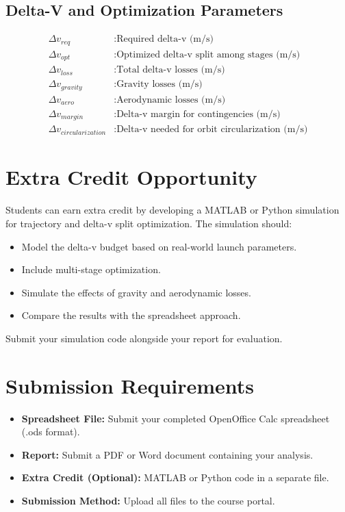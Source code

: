 \documentclass[a4paper,12pt]{article}
\begin{document}
\subsection{Delta-V and Optimization Parameters}
\begin{align*}
    \Delta v_{req} & : \text{Required delta-v (m/s)} \\
    \Delta v_{opt} & : \text{Optimized delta-v split among stages (m/s)} \\
    \Delta v_{loss} & : \text{Total delta-v losses (m/s)} \\
    \Delta v_{gravity} & : \text{Gravity losses (m/s)} \\
    \Delta v_{aero} & : \text{Aerodynamic losses (m/s)} \\
    \Delta v_{margin} & : \text{Delta-v margin for contingencies (m/s)} \\
    \Delta v_{circularization} & : \text{Delta-v needed for orbit circularization (m/s)}
\end{align*}

\section{Extra Credit Opportunity}
Students can earn extra credit by developing a MATLAB or Python simulation for trajectory and delta-v split optimization. The simulation should:
\begin{itemize}
    \item Model the delta-v budget based on real-world launch parameters.
    \item Include multi-stage optimization.
    \item Simulate the effects of gravity and aerodynamic losses.
    \item Compare the results with the spreadsheet approach.
\end{itemize}
Submit your simulation code alongside your report for evaluation.

\section{Submission Requirements}
\begin{itemize}
    \item \textbf{Spreadsheet File:} Submit your completed OpenOffice Calc spreadsheet (.ods format).
    \item \textbf{Report:} Submit a PDF or Word document containing your analysis.
    \item \textbf{Extra Credit (Optional):} MATLAB or Python code in a separate file.
    \item \textbf{Submission Method:} Upload all files to the course portal.
\end{itemize}
\end{document}
